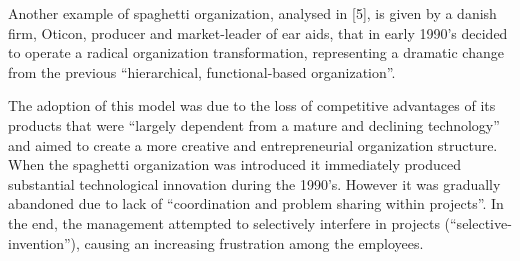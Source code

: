 Another example of spaghetti organization, analysed in [5], is given by a danish firm, Oticon, producer and market-leader of ear aids, that in early 1990’s decided to operate a radical organization transformation, representing a dramatic change from the previous “hierarchical, functional-based organization”.

The adoption of this model was due to the loss of competitive advantages of its products that were “largely dependent from a mature and declining technology” and aimed to create a more creative and entrepreneurial organization structure. When the spaghetti organization was introduced it immediately produced substantial technological innovation during the 1990’s.
However it was gradually abandoned due to lack of “coordination and problem sharing within projects”. In the end, the management attempted to selectively interfere in projects (“selective-invention”), causing an increasing frustration among the employees.
